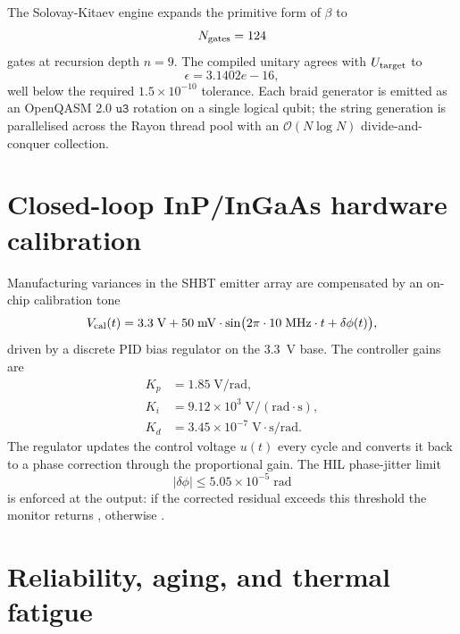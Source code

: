 \documentclass[aps,pra,10pt,onecolumn,superscriptaddress,nofootinbib,longbibliography,floatfix]{revtex4-2}
\newcommand{\ExoticBraidDepth}{9}%
\newcommand{\ExoticBraidGateCount}{124}%
\newcommand{\ExoticBraidApproxError}{3.1402e-16}%
\begin{document}
The Solovay-Kitaev engine expands the primitive form of $\beta$ to
%
\begin{equation}
N_{\rm gates} = \ExoticBraidGateCount{}
\end{equation}
%
gates at recursion depth $n = \ExoticBraidDepth{}$.  The compiled unitary agrees with $U_{\rm target}$ to
%
\begin{equation}
\epsilon = \ExoticBraidApproxError{} ,
\end{equation}
%
well below the required $1.5 \times 10^{-10}$ tolerance.  Each braid generator is emitted as an OpenQASM 2.0 $\texttt{u3}$ rotation on a single logical qubit; the string generation is parallelised across the Rayon thread pool with an $\mathcal{O}(N \log N)$ divide-and-conquer collection.

\section{Closed-loop InP/InGaAs hardware calibration}

Manufacturing variances in the SHBT emitter array are compensated by an on-chip calibration tone
%
\begin{equation}
V_{\rm cal}(t) = 3.3\;\mathrm{V} + 50\;\mathrm{mV} \cdot \sin\bigl(2\pi \cdot 10\;\mathrm{MHz} \cdot t + \delta\phi(t)\bigr) ,
\end{equation}
%
driven by a discrete PID bias regulator on the 3.3~V base.  The controller gains are
%
\begin{align}
K_p &= 1.85\;\mathrm{V/rad}, \\
K_i &= 9.12 \times 10^{3}\;\mathrm{V/(rad\cdot s)}, \\
K_d &= 3.45 \times 10^{-7}\;\mathrm{V\cdot s/rad} .
\end{align}
%
The regulator updates the control voltage $u(t)$ every cycle and converts it back to a phase correction through the proportional gain.  The HIL phase-jitter limit
%
\begin{equation}
|\delta\phi| \le 5.05 \times 10^{-5}\;\mathrm{rad}
\end{equation}
%
is enforced at the output: if the corrected residual exceeds this threshold the monitor returns , otherwise .

\section{Reliability, aging, and thermal fatigue}
\end{document}
